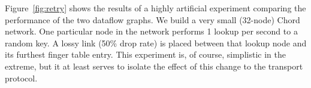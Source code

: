 

Figure~\ref{fig:retry} shows the results of a highly artificial
experiment comparing the performance of the two dataflow graphs.  We
build a very small (32-node) Chord network.  One 
particular node in the network performs 1 lookup per second to a
random key.  A lossy link (50\% drop rate) is placed between that lookup node and its
furthest finger table entry.
This experiment is, of course, simplistic in the extreme, but it
at least serves to isolate the effect of this change to the transport
protocol.

